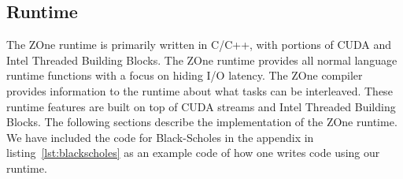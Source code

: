 
\subsection{Runtime}
The ZOne runtime is primarily written in C/C++, with portions of CUDA and
Intel Threaded Building Blocks.
 The ZOne runtime provides all
normal language runtime functions with a focus on hiding I/O latency. The ZOne
compiler provides information to the runtime about what tasks can be
interleaved. These runtime features are built on top of CUDA streams and 
Intel Threaded Building Blocks. The following sections describe the
implementation of the ZOne runtime.
We have included the code for Black-Scholes in the appendix in 
listing~\ref{lst:blackscholes} as an example code of how one writes code using our runtime.





